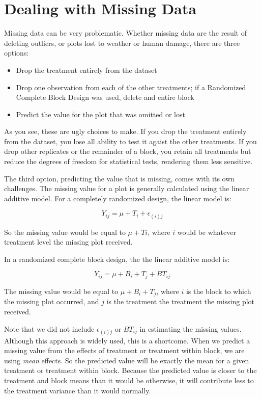 \documentclass[
]{book}
\providecommand{\tightlist}{%
  \setlength{\itemsep}{0pt}\setlength{\parskip}{0pt}}
\begin{document}
\hypertarget{dealing-with-missing-data}{%
\section{Dealing with Missing Data}\label{dealing-with-missing-data}}

Missing data can be very problematic. Whether missing data are the result of deleting outliers, or plots lost to weather or human damage, there are three options:

\begin{itemize}
\tightlist
\item
  Drop the treatment entirely from the dataset
\item
  Drop one observation from each of the other treatments; if a Randomized Complete Block Design was used, delete and entire block
\item
  Predict the value for the plot that was omitted or lost
\end{itemize}

As you see, these are ugly choices to make. If you drop the treatment entirely from the dataset, you lose all ability to test it agaist the other treatments. If you drop other replicates or the remainder of a block, you retain all treatments but reduce the degrees of freedom for statistical tests, rendering them less sensitive.

The third option, predicting the value that is missing, comes with its own challenges. The missing value for a plot is generally calculated using the linear additive model. For a completely randomized design, the linear model is:

\[Y_{ij} = \mu + T_i + \epsilon_{(i)j} \]

So the missing value would be equal to \(\mu + Ti\), where \(i\) would be whatever treatment level the missing plot received.

In a randomized complete block design, the the linear additive model is:

\[Y_{ij} = \mu + B_i + T_j + BT_{ij} \]

The missing value would be equal to \(\mu + B_i + T_j\), where \(i\) is the block to which the missing plot occurred, and \(j\) is the treatment the treatment the missing plot received.

Note that we did not include \(\epsilon_{(i)j}\) or \(BT_{ij}\) in estimating the missing values. Although this approach is widely used, this is a shortcome. When we predict a missing value from the effects of treatment or treatment within block, we are using \emph{mean} effects. So the predicted value will be exactly the mean for a given treatment or treatment within block. Because the predicted value is closer to the treatment and block means than it would be otherwise, it will contribute less to the treatment variance than it would normally.
\end{document}
